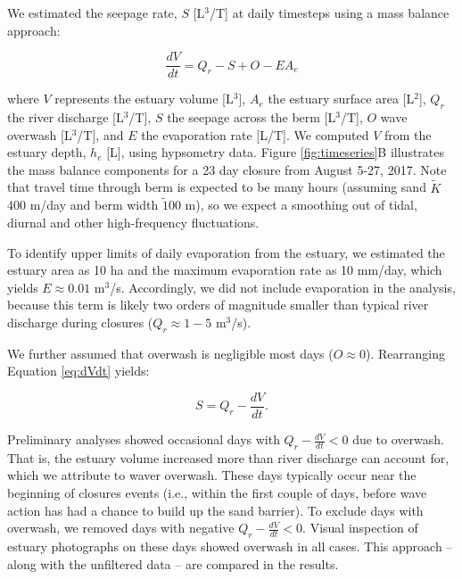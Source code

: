 \documentclass[preprint,12pt,authoryear]{elsarticle}
\begin{document}
We estimated the seepage rate, $S$ [L$^3$/T] at daily timesteps using a mass balance approach:

\begin{equation}
\label{eq:dVdt}
    \frac{dV}{ dt} = Q_r - S + O - E A_e
\end{equation}

\noindent  where $V$  represents the estuary volume [L$^3$], 
$A_e$   the estuary surface area [L$^2$], 
$Q_r$ the river discharge [L$^3$/T],
$S$ the seepage across the berm [L$^3$/T], 
$O$ wave overwash [L$^3$/T], and $E$  the evaporation rate [L/T].
We computed $V$ from the estuary depth, $h_e$ [L], using hypsometry data.
Figure \ref{fig:timeseries}B illustrates the mass balance components for a 23 day closure from August 5-27, 2017.
 Note that travel time through berm is expected to be many hours (assuming sand $\tilde K$ 400 m/day and berm width $\tilde 100$ m), so we expect a smoothing out of tidal, diurnal and other high-frequency fluctuations. 

To identify upper limits of daily evaporation from the estuary, 
we estimated the estuary area as 10 ha and the maximum  evaporation rate as 10 mm/day, which yields $E \approx 0.01$ m$^3$/s. Accordingly, we did not include evaporation in the analysis, because this term is likely two orders of magnitude smaller than typical river discharge during closures ($Q_r \approx 1-5$ m$^3$/s).  

We further assumed that overwash is negligible most days ($O \approx 0$).  Rearranging Equation \ref{eq:dVdt} yields:

\begin{equation}
\label{eq:S}
    S  = Q_r - \frac{dV}{ dt}.
\end{equation}

Preliminary analyses showed occasional days with  $Q_r - \frac{dV}{ dt} <0$ due to overwash. That is, the estuary volume increased more than river discharge can account for, which we attribute to waver overwash.
These days typically occur near the beginning of closures events (i.e., within the first couple of days, before wave action has had a chance to build up the sand barrier).
To exclude days with overwash, we removed days with negative $ Q_r - \frac{dV}{ dt} < 0$.  Visual inspection of estuary photographs on these days showed overwash in all cases.
This approach -- along with the unfiltered data -- are compared in the results. 
\end{document}
